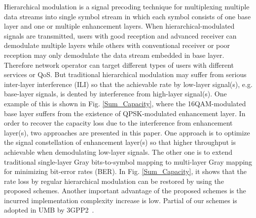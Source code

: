 \documentclass[10pt,fleqn, twocolumn]{IEEEtran}
\begin{document}
\begin{figure}
\end{figure}
Hierarchical modulation is a signal precoding technique for
multiplexing multiple data streams into single symbol stream in
which each symbol consists of one base layer and one or multiple
enhancement layers. When hierarchical-modulated signals are
transmitted, users with good reception and advanced receiver can
demodulate multiple layers while others with conventional receiver
or poor reception may only demodulate the data stream embedded in
base layer. Therefore network operator can target different types
of users with different services or QoS. But traditional
hierarchical modulation may suffer from serious inter-layer
interference (ILI) so that the achievable rate by low-layer
signal(s), e.g. base-layer signals, is dented by interference from
high-layer signal(s). One example of this is shown in Fig.
\ref{Sum_Capacity}, where the 16QAM-modulated base layer suffers
from the existence of QPSK-modulated enhancement layer. In order
to recover the capacity loss due to the interference from
enhancement layer(s), two approaches are presented in this paper.
One approach is to optimize the signal constellation of
enhancement layer(s) so that higher throughput is achievable when
demodulating low-layer signals. The other one is to extend
traditional single-layer Gray bits-to-symbol mapping to
multi-layer Gray mapping for minimizing bit-error rates (BER). In
Fig. \ref{Sum_Capacity}, it shows that the rate loss by regular
hierarchical modulation can be restored by using the proposed
schemes. Another important advantage of the proposed schemes is
the incurred implementation complexity increase is low. Partial of
our schemes is adopted in UMB by 3GPP2~\cite{UMB}.
\end{document}

